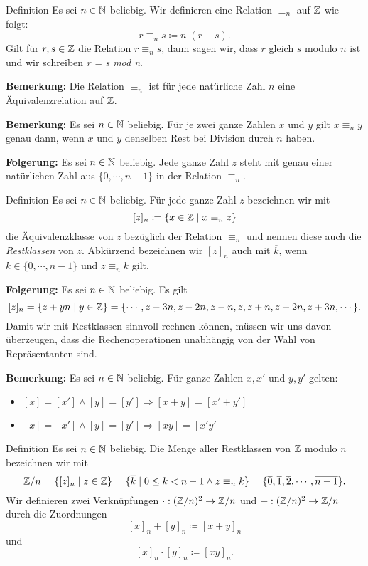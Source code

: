 \begin{definition}{Definition}
    Es sei $n \in \mathbb{N}$ beliebig.
    Wir definieren eine Relation $\equiv_n$ auf $\mathbb{Z}$ wie folgt: \[r \equiv_n s \coloneqq n|(r-s).\]
    Gilt für $r,s \in \mathbb{Z}$ die Relation $r \equiv_n s$, dann sagen wir, dass $r$ gleich $s$ modulo $n$ ist und wir schreiben \emph{r = s mod n}.
\end{definition}

\textbf{Bemerkung:} Die Relation $\equiv_n$ ist für jede natürliche Zahl $n$ eine Äquivalenzrelation auf $\mathbb{Z}$.

\textbf{Bemerkung:} Es sei $n \in \mathbb{N}$ beliebig.
Für je zwei ganze Zahlen $x$ und $y$ gilt $x \equiv_n y$ genau dann, wenn $x$ und $y$ denselben Rest bei Division durch $n$ haben.

\textbf{Folgerung:} Es sei $n \in \mathbb{N}$ beliebig.
Jede ganze Zahl $z$ steht mit genau einer natürlichen Zahl aus $\{0,\cdots,n-1\}$ in der Relation $\equiv_n$.

\begin{definition}{Definition}
    Es sei $n \in \mathbb{N}$ beliebig.
    Für jede ganze Zahl $z$ bezeichnen wir mit \[[z]_n \coloneqq \{ x \in \mathbb{Z} \mid x \equiv_n z \}\] die Äquivalenzklasse von $z$ bezüglich der Relation $\equiv_n$ und nennen diese auch die \emph{Restklassen} von $z$.
    Abkürzend bezeichnen wir $[z]_n$ auch mit $\overline{k}$, wenn $k \in \{ 0, \cdots, n-1\}$ und $z \equiv_n k$ gilt.
\end{definition}

\textbf{Folgerung:} Es sei $n \in \mathbb{N}$ beliebig.
Es gilt \[[z]_n = \{ z + yn \mid y \in \mathbb{Z} \} = \{\cdots, z-3n, z-2n, z-n,z,z+n, z+2n, z+3n, \cdots \}.\] Damit wir mit Restklassen sinnvoll rechnen können, müssen wir uns davon überzeugen, dass die Rechenoperationen unabhängig von der Wahl von Repräsentanten sind.

\textbf{Bemerkung:} Es sei $n \in \mathbb{N}$ beliebig.
Für ganze Zahlen $x, x'$ und $y, y'$ gelten:
\vspace{-\topsep}
\begin{itemize}
    \item $[x] = [x'] \land [y] = [y'] \Rightarrow [x + y] = [x' + y']$
    \item $[x] = [x'] \land [y] = [y'] \Rightarrow [xy] = [x'y']$
\end{itemize}

\begin{definition}{Definition}
    Es sei $n \in \mathbb{N}$ beliebig.
    Die Menge aller Restklassen von $\mathbb{Z}$ modulo $n$ bezeichnen wir mit \[\mathbb{Z}/n = \{ [z]_n \mid z \in \mathbb{Z} \} = \{ \overline{k} \mid 0 \leq k < n - 1 \land z \equiv_n k \} = \{\overline{0}, \overline{1}, \overline{2}, \cdots, \overline{n-1} \}.\]
    Wir definieren zwei Verknüpfungen $\cdot : (\mathbb{Z}/n)^2 \rightarrow \mathbb{Z}/n$ und $+ : (\mathbb{Z}/n)^2 \rightarrow \mathbb{Z}/n$ durch die Zuordnungen \[[x]_n + [y]_n \coloneqq [x + y]_n\] und \[[x]_n \cdot [y]_n \coloneqq [xy]_n.\]
\end{definition}

